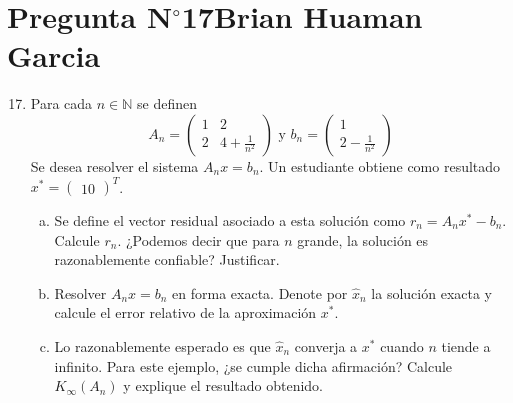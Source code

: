 \section{Pregunta N$^{\circ}$17\qquad Brian Huaman Garcia}

\begin{frame}
	\begin{enumerate}\setcounter{enumi}{16}
		\item

		      Para cada $n\in\mathbb{N}$ se definen
		      \begin{equation*}
			      A_{n}=
			      \begin{pmatrix}
				      1 & 2               \\
				      2 & 4+\frac{1}{n^2}
			      \end{pmatrix}
			      \text{ y }
			      b_{n}=
			      \begin{pmatrix}
				      1 \\
				      2-\frac{1}{n^2}
			      \end{pmatrix}
		      \end{equation*}
		      Se desea resolver el sistema $A_{n}x=b_{n}$.
		      Un estudiante obtiene como resultado
		      \begin{math}
			      x^{\ast}=
				      {
					      \begin{pmatrix}
						      1 0
					      \end{pmatrix}
				      }^{T}
		      \end{math}.

		      \begin{enumerate}[a)]
			      \item

			            Se define el vector residual asociado a esta
			            solución como $r_{n}=A_{n}x^{\ast}-b_{n}$.
			            Calcule $r_{n}$.
			            ¿Podemos decir que para $n$ grande, la solución es
			            razonablemente confiable?
			            Justificar.

			      \item

			            Resolver $A_{n}x=b_{n}$ en forma exacta.
			            Denote por $\widehat{x}_{n}$ la solución exacta y
			            calcule el error relativo de la aproximación
			            $x^{\ast}$.

			      \item

			            Lo razonablemente esperado es que
			            $\widehat{x}_{n}$ converja a $x^{\ast}$ cuando
			            $n$ tiende a infinito.
			            Para este ejemplo, ¿se cumple dicha afirmación?
			            Calcule $K_{\infty}\left(A_{n}\right)$ y explique
			            el resultado obtenido.
		      \end{enumerate}
	\end{enumerate}
	\begin{solution}


\end{solution}
\end{frame}
